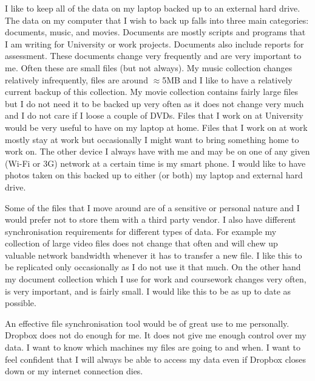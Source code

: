 \documentclass[12pt]{article}
\begin{document}
I like to keep all of the data on my laptop backed up to an
external hard drive. The data on my computer that I wish
to back up falls into three main categories: documents, music, and movies.
Documents are mostly scripts and programs that I am writing for
University or work projects. Documents also include reports for
assessment. These documents change very frequently and are very important
to me. Often these are small files (but not always). My music collection
changes relatively infrequently, files are around $\approx$5MB and I like to
have a relatively current backup of this collection. My movie collection
contains fairly large files but I do not need it to be backed up very often
as it does not change very much and I do not care if I loose a couple of
DVDs. Files that I work on at University would be very useful to have
on my laptop at home. Files that I work on at work mostly stay at work
but occasionally I might want to bring something home to work on.
The other device I always have with me and may be on one of any given
(Wi-Fi or 3G) network at a certain time is my smart phone. I would like
to have photos taken on this backed up to either (or both) my laptop and
external hard drive. 

Some of the files that I move around are of a sensitive or personal nature
and I would prefer not to store them with a third party vendor.
I also have different synchronisation requirements for different
types of data. 
For example my collection of large video files does not change that often
and will chew up valuable network bandwidth whenever it has to transfer
a new file. I like this to be replicated only occasionally as I do not
use it that much. On the other hand my document collection which I use
for work and coursework changes very often, is very important, and
is fairly small. I would like this to be as up to date as possible.

An effective file synchronisation tool would be of
great use to me personally. Dropbox does not do enough
for me. It does not give me enough control over my data.
I want to know which machines my files are going to and when.
I want to feel confident that I will always be able to access
my data even if Dropbox closes down or my internet connection
dies.

\end{document}
